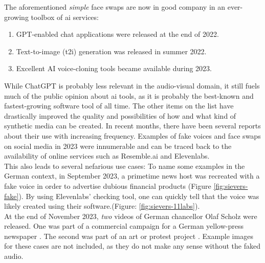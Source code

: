 \documentclass[
  a4paper,  %
  twoside,  %
  bibliography=totoc,
  headsepline,
  cleardoublepage=empty,
  parskip=half,
  draft=false
]{scrbook}
\begin{document}
The aforementioned \textit{simple} face swaps are now in good company in an ever-growing toolbox of \gls{ai} services: 
\begin{enumerate}
  \item GPT-enabled chat applications were released at the end of 2022.
  \item Text-to-image (t2i) generation was released in summer 2022.
  \item Excellent AI voice-cloning tools became available during 2023.
\end{enumerate}
While ChatGPT is probably less relevant in the audio-visual domain, it still fuels much of the public opinion about \gls{ai} tools, as it is probably the best-known and fastest-growing software tool of all time. The other items on the list have drastically improved the quality and possibilities of how and what kind of synthetic media can be created. In recent months, there have been several reports about their use with increasing frequency. Examples of fake voices and face swaps on social media in 2023 were innumerable and can be traced back to the availability of online services such as Resemble.ai and Elevenlabs. \\
This also leads to several nefarious use cases: To name some examples in the German context, in September 2023, a primetime news host was recreated with a fake voice in order to advertise dubious financial products (Figure \ref{fig:sievers-fake}). By using Elevenlabs' checking tool, one can quickly tell that the voice was likely created using their software.(Figure: \ref{fig:sievers-11labs}). \\
At the end of November 2023, \textit{two} videos of German chancellor Olaf Scholz were released. One was part of a commercial campaign for a German yellow-press newspaper \cite{dwdl.deSpringerTrommeltMit}. The second was part of an art or protest project \cite{zdfKunstinstallationDeepfakeScholzVerkuendet}. Example images for these cases are not included, as they do not make any sense without the faked audio. 
\end{document}
